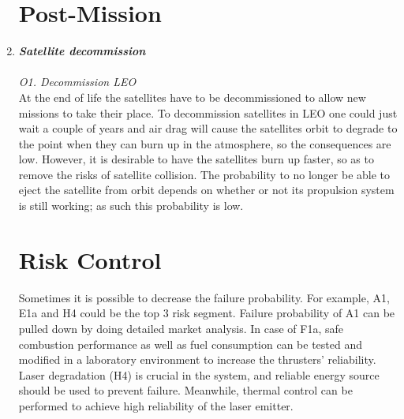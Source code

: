 \begin{enumerate}[A]
\section{Post-Mission}
\label{blTRAPm}
	\item\textbf{\textit{Satellite decommission}} \\\\
\textit{O1. Decommission LEO}\\ 
At the end of life the satellites have to be decommissioned to allow new missions to take their place. To decommission satellites in \ac{LEO} one could just wait a couple of years and air drag will cause the satellites orbit to degrade to the point when they can burn up in the atmosphere, so the consequences are low. However, it is desirable to have the satellites burn up faster, so as to remove the risks of satellite collision. The probability to no longer be able to eject the satellite from orbit depends on whether or not its propulsion system is still working; as such this probability is low.

\section{Risk Control}
\label{blTRARC}
Sometimes it is possible to decrease the failure probability. For example, A1, E1a and H4 could be the top 3 risk segment. Failure probability of A1 can be pulled down by doing detailed market analysis. In case of F1a, safe combustion performance as well as fuel consumption can be tested and modified in a laboratory environment to increase the thrusters' reliability. Laser degradation (H4) is crucial in the system, and reliable energy source should be used to prevent failure. Meanwhile, thermal control can be performed to achieve high reliability of the laser emitter.  


\end{enumerate}
